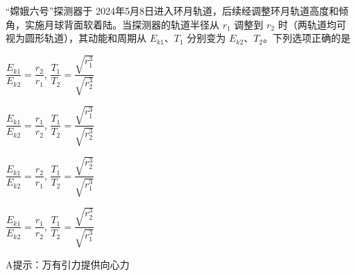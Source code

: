“嫦娥六号”探测器于 2024年5月8日进入环月轨道，后续经调整环月轨道高度和倾角，实施月球背面软着陆。当探测器的轨道半径从 \(r_1\) 调整到 \(r_2\) 时（两轨道均可视为圆形轨道），其动能和周期从 \(E_{k1}\)、\(T_1\) 分别变为 \(E_{k2}\)、\(T_2\)。下列选项正确的是\paren[]
\begin{choices}
	\item \(\dfrac{E_{k1}}{E_{k2}} = \dfrac{r_2}{r_1}\),\: \(\dfrac{T_1}{T_2} = \dfrac{\sqrt{r_1^3}}{\sqrt{r_2^3}}\)
	\item \(\dfrac{E_{k1}}{E_{k2}} = \dfrac{r_1}{r_2}\),\: \(\dfrac{T_1}{T_2} = \dfrac{\sqrt{r_1^3}}{\sqrt{r_2^3}}\)
	\item \(\dfrac{E_{k1}}{E_{k2}} = \dfrac{r_2}{r_1}\),\: \(\dfrac{T_1}{T_2} = \dfrac{\sqrt{r_2^3}}{\sqrt{r_1^3}}\)
	\item \(\dfrac{E_{k1}}{E_{k2}} = \dfrac{r_1}{r_2}\),\: \(\dfrac{T_1}{T_2} = \dfrac{\sqrt{r_2^3}}{\sqrt{r_1^3}}\)
\end{choices}
\begin{answer}
	A\qquad 提示：万有引力提供向心力
\end{answer}


